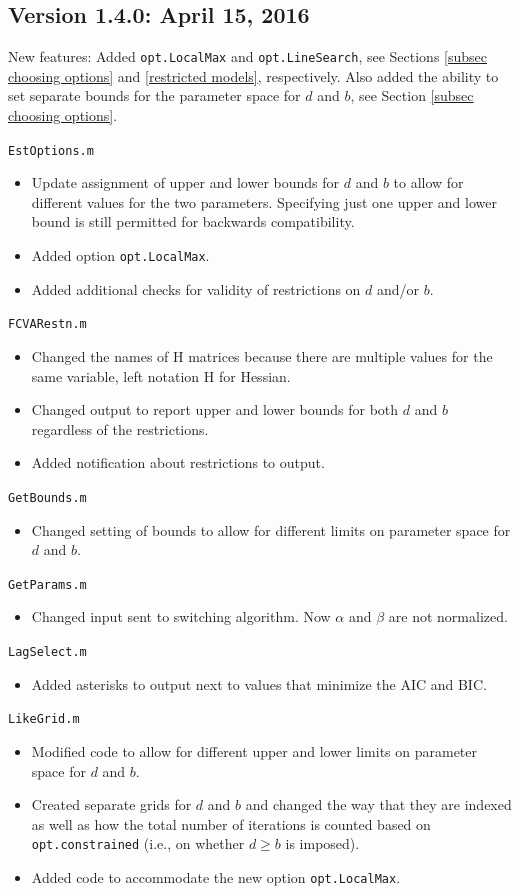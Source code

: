\documentclass[10pt]{article}
\begin{document}
\subsection{Version 1.4.0: April 15, 2016}

\noindent New features: Added \verb|opt.LocalMax| and \verb|opt.LineSearch|, see Sections \ref{subsec choosing options} and \ref{restricted models}, respectively. Also added the ability to set separate bounds for the parameter space for $d$ and $b$, see Section \ref{subsec choosing options}.

\noindent \verb|EstOptions.m|
\begin{itemize}
\item Update assignment of upper and lower bounds for $d$ and $b$ to allow for different values for the two parameters. Specifying just one upper and lower bound is still permitted for backwards compatibility.
\item Added option \verb|opt.LocalMax|.
\item Added additional checks for validity of restrictions on $d$ and/or $b$.
\end{itemize}
\noindent \verb|FCVARestn.m|
\begin{itemize}
\item Changed the names of H matrices because there are multiple values for the same variable, left notation H for Hessian.
\item Changed output to report upper and lower bounds for both $d$ and $b$ regardless of the restrictions.
\item Added notification about restrictions to output. 
\end{itemize}
\noindent \verb|GetBounds.m|
\begin{itemize}
\item Changed setting of bounds to allow for different limits on parameter space for $d$ and $b$.
\end{itemize}
\noindent \verb|GetParams.m|
\begin{itemize}
\item Changed input sent to switching algorithm. Now $\alpha$ and $\beta$ are not normalized.
\end{itemize}
\noindent \verb|LagSelect.m|
\begin{itemize}
\item Added asterisks to output next to values that minimize the AIC and BIC.
\end{itemize}
\noindent \verb|LikeGrid.m|
\begin{itemize}
\item Modified code to allow for different upper and lower limits on parameter space for $d$ and $b$.
\item Created separate grids for $d$ and $b$ and changed the way that they are indexed as well as how the total number of iterations is counted based on \verb|opt.constrained| (i.e., on whether $d \geq b$ is imposed).
\item Added code to accommodate the new option \verb|opt.LocalMax|.
\end{itemize}
\end{document}
